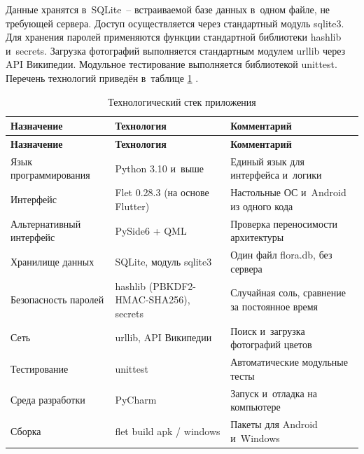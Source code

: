 \documentclass[14pt,a4paper]{extarticle}
\begin{document}
Данные хранятся в~SQLite~– встраиваемой базе данных в~одном файле, не требующей сервера. Доступ осуществляется через стандартный модуль sqlite3. Для хранения паролей применяются функции стандартной библиотеки hashlib и~secrets. Загрузка фотографий выполняется стандартным модулем urllib через API Википедии. Модульное тестирование выполняется библиотекой unittest. Перечень технологий приведён в~таблице \ref{tab:2.2} \cite{b1,b5,b7}.



\begingroup\small\singlespacing\setlength{\LTpre}{6pt}\setlength{\LTpost}{10pt}
\begin{longtable}{|>{\raggedright\arraybackslash}p{}|>{\raggedright\arraybackslash}p{}|>{\raggedright\arraybackslash}p{}|}
\caption{Технологический стек приложения}\label{tab:2.2}\\
\hline
\rowcolor{gray!15}\centering\arraybackslash\bfseries Назначение & \centering\arraybackslash\bfseries Технология & \centering\arraybackslash\bfseries Комментарий \\ \hline
\endfirsthead
\hline
\rowcolor{gray!15}\centering\arraybackslash\bfseries Назначение & \centering\arraybackslash\bfseries Технология & \centering\arraybackslash\bfseries Комментарий \\ \hline
\endhead
Язык программирования & Python 3.10 и~выше & Единый язык для интерфейса и~логики \\ \hline
Интерфейс & Flet 0.28.3 (на основе Flutter) & Настольные ОС и~Android из одного кода \\ \hline
Альтернативный интерфейс & PySide6 + QML & Проверка переносимости архитектуры \\ \hline
Хранилище данных & SQLite, модуль sqlite3 & Один файл flora.db, без сервера \\ \hline
Безопасность паролей & hashlib (PBKDF2-HMAC-SHA256), secrets & Случайная соль, сравнение за постоянное время \\ \hline
Сеть & urllib, API Википедии & Поиск и~загрузка фотографий цветов \\ \hline
Тестирование & unittest & Автоматические модульные тесты \\ \hline
Среда разработки & PyCharm & Запуск и~отладка на компьютере \\ \hline
Сборка & flet build apk / windows & Пакеты для Android и~Windows \\ \hline
\end{longtable}\endgroup
\end{document}
